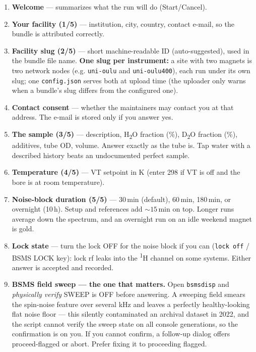 \documentclass[11pt]{article}
\newcommand{\hnmr}{\textsuperscript{1}H}
\newcommand{\dtwo}{D\textsubscript{2}O}
\newcommand{\htwo}{H\textsubscript{2}O}
\newcommand{\file}[1]{\texttt{#1}}
\newcommand{\dialog}[1]{\textbf{#1}}
\begin{document}
\begin{enumerate}
\item \dialog{Welcome} --- summarizes what the run will do (Start/Cancel).
\item \dialog{Your facility (1/5)} --- institution, city, country, contact
      e-mail, so the bundle is attributed correctly.
\item \dialog{Facility slug (2/5)} --- short machine-readable ID
      (auto-suggested), used in the bundle file name. \textbf{One slug per
      instrument:} a site with two magnets is two network nodes (e.g.
      \texttt{uni-oulu} and \texttt{uni-oulu400}), each run under its own
      slug; one \file{config.json} serves both at upload time (the
      uploader only warns when a bundle's slug differs from the configured
      one).
\item \dialog{Contact consent} --- whether the maintainers may contact you at
      that address. The e-mail is stored only if you answer yes.
\item \dialog{The sample (3/5)} --- description, \htwo{} fraction (\%),
      \dtwo{} fraction (\%), additives, tube OD, volume. Answer exactly as the
      tube is. Tap water with a described history beats an undocumented
      perfect sample.
\item \dialog{Temperature (4/5)} --- VT setpoint in K (enter 298 if VT is off
      and the bore is at room temperature).
\item \dialog{Noise-block duration (5/5)} --- 30\,min (default), 60\,min,
      180\,min, or overnight (10\,h). Setup and references add
      ${\sim}15$\,min on top. Longer runs average down the spectrum, and
      an overnight run on an idle weekend magnet is gold.
\item \dialog{Lock state} --- turn the lock OFF for the noise block if you
      can (\texttt{lock off} / BSMS LOCK key): lock rf leaks into the \hnmr{}
      channel on some systems. Either answer is accepted and recorded.
\item \dialog{BSMS field sweep --- the one that matters.} Open
      \texttt{bsmsdisp} and \emph{physically verify} SWEEP is OFF before
      answering. A sweeping field smears the spin-noise feature over several
      kHz and leaves a perfectly healthy-looking flat noise floor --- this
      silently contaminated an archival dataset in 2022, and the script
      cannot verify the sweep state on all console generations, so the
      confirmation is on you. If you cannot confirm, a follow-up dialog
      offers proceed-flagged or abort. Prefer fixing it to proceeding flagged.

\end{enumerate}
\end{document}

